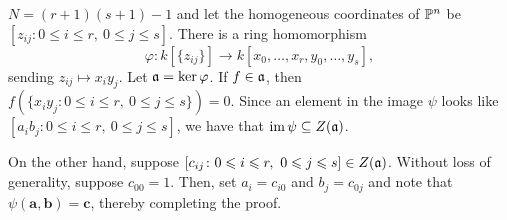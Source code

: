 \setcounter{exercise}{13}

\begin{exercise}
    $N = (r + 1)(s + 1) - 1$ and let the homogeneous coordinates of $\mathbb{P}^n$ be $[z_{ij}\colon 0\le i\le r,~0\le j\le s]$. There is a ring homomorphism 
    \begin{equation*}
    \varphi: k[\{z_{ij}\}]\to k[x_0,\dots,x_r,y_0,\dots,y_s],
    \end{equation*}
    sending $z_{ij}\mapsto x_iy_j$. Let $\mathfrak{a} = \ker\varphi$. If $f\in\mathfrak{a}$, then $f(\{x_iy_j\colon 0\le i\le r,~0\le j\le s\}) = 0$. Since an element in the image $\psi$ looks like $[a_ib_j\colon 0\le i\le r,~0\le j\le s]$, we have that $\operatorname{im}\psi\subseteq Z(\mathfrak{a})$.

    On the other hand, suppose $[c_{ij}\colon 0\leqslant i\leqslant r,~0\leqslant j\leqslant s]\in Z(\mathfrak{a})$. Without loss of generality, suppose $c_{00} = 1$. Then, set $a_i = c_{i0}$ and $b_j = c_{0j}$ and note that $\psi(\mathbf a,\mathbf b) = \mathbf c$, thereby completing the proof.
\end{exercise}